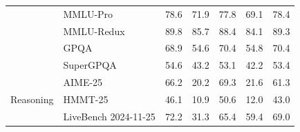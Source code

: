 \begin{table}[t]
\begin{tabular}{lllllll}
                                       & MMLU-Pro               & 78.6                       & 71.9                     & 77.8      & 69.1         & 78.4                           \\
                                       & MMLU-Redux             & 89.8                       & 85.7                     & 88.4           & 84.1    & 89.3                        \\
                                       & GPQA                   & 68.9                       & 54.6                     & 70.4        & 54.8 & 70.4                        \\
                                       & SuperGPQA              & 54.6                       & 43.2                     & 53.1           & 42.2       & 53.4                           \\
\midrule
\multirow{4}{*}{Reasoning}     
                                       & AIME-25                 & 66.2                       & 20.2                     & 69.3         & 21.6 & 61.3                        \\

                            & HMMT-25                 & 46.1                       & 10.9                     & 50.6       &   12.0     & 43.0                        \\
                                       & LiveBench {\tiny 2024-11-25}          & 72.2                       & 31.3                     & 65.4      &  59.4       & 69.0                        \\


\end{tabular}
\end{table}
